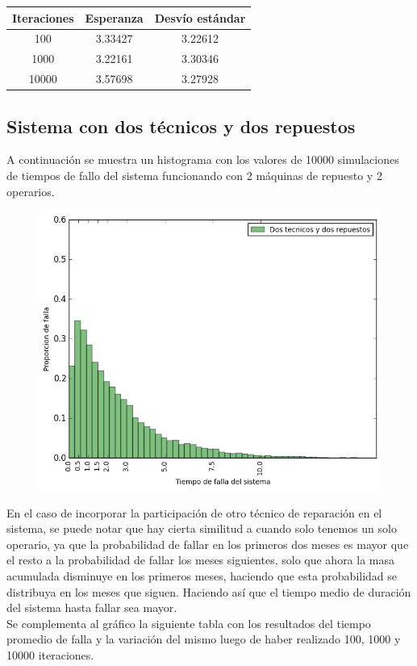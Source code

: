 \documentclass[10pt,a4paper]{article} %
\begin{document}
    \begin{center}
        \begin{tabular}{ c| c| c}
            Iteraciones & Esperanza & Desv\'io est\'andar \\ \hline
            100&    3.33427 & 3.22612  \\ \hline
            1000&   3.22161 & 3.30346  \\ \hline
	        10000&  3.57698 & 3.27928  \\ \hline

        \end{tabular}
    \end{center}
    
    \subsection{Sistema con dos t\'ecnicos y dos repuestos}
    A continuaci\'on se muestra un histograma con los valores de 10000 simulaciones de tiempos de fallo del sistema funcionando con 2 m\'aquinas de repuesto y 2 operarios.
    \begin {figure}[!htb]
    \centering
    \includegraphics[width=12cm] {img/2op2rep}
    \end {figure}

    En el caso de incorporar la participaci\'on de otro t\'ecnico de reparaci\'on en el sistema, se puede notar que hay cierta similitud a cuando solo tenemos un solo operario, ya que la probabilidad de fallar en los primeros dos meses es mayor que el resto a la probabilidad de fallar los meses siguientes, solo que ahora la masa acumulada disminuye en los primeros meses, haciendo que esta probabilidad se distribuya en los meses que siguen. Haciendo as\'i que el tiempo medio de duraci\'on del sistema hasta fallar sea mayor. \\
    Se complementa al gr\'afico la siguiente tabla con los resultados del tiempo promedio de falla y la variaci\'on del mismo luego de haber realizado 100, 1000 y 10000 iteraciones.
    
\end{document}
